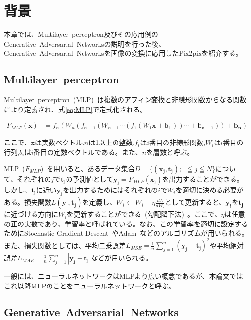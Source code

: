 \chapter{背景}

本章では、Multilayer~perceptron及びその応用例のGenerative~Adversarial~Networksの説明を行った後、Generative~Adversarial~Networksを画像の変換に応用したPix2pixを紹介する。

\section{Multilayer~perceptron}

Multilayer~perceptron~(MLP)~は複数のアフィン変換と非線形関数からなる関数により定義され、式\ref{eq:MLP}で定式化される。

\begin{align}
    \label{eq:MLP}
    F_{MLP}(\boldsymbol{x})&=f_{n}(W_{n}(f_{n-1}(W_{n-1}\cdots(f_{1}(W_{1}\boldsymbol{x}+\boldsymbol{b_{1}}))\cdots+\boldsymbol{b_{n-1}}))+\boldsymbol{b_{n}})
\end{align}

ここで、$\boldsymbol{x}$は実数ベクトル,$n$は1以上の整数,$f_{i}$は$i$番目の非線形関数,$W_{i}$は$i$番目の行列,$b_{i}$は$i$番目の定数ベクトルである。また、$n$を層数と呼ぶ。



MLP~($F_{MLP}$)~を用いると、あるデータ集合$D=\{(\boldsymbol{x_j},\boldsymbol{t_j}); 1 \leqq j \leqq N\}$について、それぞれの$j$で$\boldsymbol{t_{j}}$の予測値として$\boldsymbol{y_j}=F_{MLP}(\boldsymbol{x_j})$を出力することができる。しかし、$\boldsymbol{t_j}$に近い$\boldsymbol{y_j}$を出力するためにはそれぞれの$i$で$W_i$を適切に決める必要がある。損失関数$L(\boldsymbol{y_j},\boldsymbol{t_j})$を定義し、$W _i \leftarrow W_i - \eta \frac{d L}{dW_i}$として更新すると、$\boldsymbol{y_j}$を$\boldsymbol{t_j}$に近づける方向に$W_i$を更新することができる~(勾配降下法)~。ここで、$\eta$は任意の正の実数であり、学習率と呼ばれている。なお、この学習率を適切に設定するためにStochastic Gradient Descent~\cite{SGD}やAdam~\cite{Adam}などのアルゴリズムが用いられる。また、損失関数としては、平均二乗誤差$L_{MSE}=\frac{1}{n}\sum _{j=1} ^{n} {(\boldsymbol{y_j} - \boldsymbol{t_j})^2}$や平均絶対誤差$L_{MAE}=\frac{1}{n}\sum _{j=1} ^{n} {|\boldsymbol{y_j} - \boldsymbol{t_j}|}$などが用いられる。

一般には、ニューラルネットワークはMLPより広い概念であるが、本論文ではこれ以降MLPのことをニューラルネットワークと呼ぶ。

\section{Generative~Adversarial~Networks}


